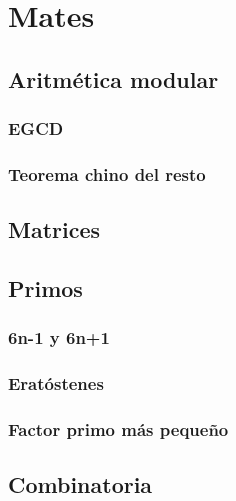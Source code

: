 \chapter{Mates}
\section{Aritmética modular}
\subsection{EGCD}
\subsection{Teorema chino del resto}

\section{Matrices}
\section{Primos}
\subsection{6n-1 y 6n+1}
\subsection{Eratóstenes}
\subsection{Factor primo más pequeño}

\section{Combinatoria}

